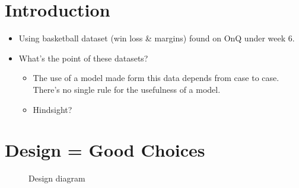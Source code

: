
\section{Introduction}

\begin{itemize}
  \item Using basketball dataset (win loss \& margins) found on OnQ under week 6.
  \item What's the point of these datasets?
        \begin{itemize}
          \item The use of a model made form this data depends from case to case. There's no single rule for the usefulness of a model.
          \item Hindsight?
        \end{itemize}
\end{itemize}

\section{Design = Good Choices}

\begin{figure}
  \caption{Design diagram}
  \label{fig:design-diagram}
\end{figure}

